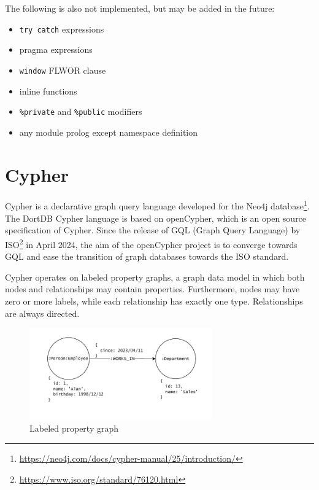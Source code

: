 The following is also not implemented, but may be added in the future:

\begin{itemize}
    \item \texttt{try catch} expressions
    \item pragma expressions
    \item \texttt{window} FLWOR clause
    \item inline functions
    \item \texttt{\%private} and \texttt{\%public} modifiers
    \item any module prolog except namespace definition
\end{itemize}

\section{Cypher}

Cypher is a declarative graph query language developed for the Neo4j database\footnote{\url{https://neo4j.com/docs/cypher-manual/25/introduction/}}. The DortDB Cypher language is based on openCypher, which is an open source specification of Cypher. Since the release of GQL (Graph Query Language) by ISO\footnote{\url{https://www.iso.org/standard/76120.html}} in April 2024, the aim of the openCypher project is to converge towards GQL and ease the transition of graph databases towards the ISO standard.

Cypher operates on labeled property graphs, a graph data model in which both nodes and relationships may contain properties. Furthermore, nodes may have zero or more labels, while each relationship has exactly one type. Relationships are always directed.

\begin{figure}[ht!]
  \centering
  \includegraphics[width=0.7\textwidth]{img/lpg.pdf}
  \caption{Labeled property graph}
  \label{fig:lpg}
\end{figure}

\pagebreak

